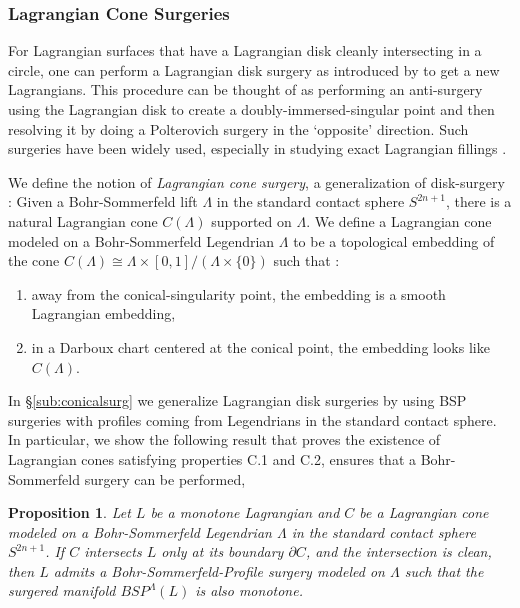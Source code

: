 \documentclass[11pt, oneside,dvipsnames]{amsart}
\newcommand{\<}{\langle}
\renewcommand{\>}{\rangle}
\newtheorem*{prop*}{Proposition}
\theoremstyle{definition}
\theoremstyle{definition}
\numberwithin{equation}{subsection}
\begin{document}
\subsubsection{Lagrangian Cone Surgeries}

For Lagrangian surfaces that have a Lagrangian disk cleanly intersecting in a circle, one can perform a Lagrangian disk surgery as introduced by \cite{yau17} to get a new Lagrangians. This procedure can be thought of as performing an anti-surgery using the Lagrangian disk to create a doubly-immersed-singular point and then resolving it by doing a Polterovich surgery in the `opposite' direction. Such surgeries have been widely used, especially in studying exact Lagrangian fillings \cite{stw1,stw2,cginfty,cwmicro}.

We define the notion of \textit{ Lagrangian cone surgery}, a generalization of disk-surgery : Given a Bohr-Sommerfeld lift $\Lambda$ in the standard contact sphere $S^{2n+1}$, there is a natural Lagrangian cone $C(\Lambda)$ supported on $\Lambda$. We define a Lagrangian cone modeled on a Bohr-Sommerfeld Legendrian $\Lambda$ to be a topological embedding of 
 the cone $C(\Lambda) \cong \Lambda \times [0,1] / ( \Lambda \times \{ 0\})$ such that :
 \begin{enumerate}[({C}.1)]
     \item  away from the conical-singularity point, the embedding is a smooth Lagrangian embedding,
     \item in a Darboux chart centered at the conical point, the embedding looks like $C(\Lambda)$.
\end{enumerate}
In \S \ref{sub:conicalsurg} we generalize Lagrangian disk surgeries by using BSP surgeries with profiles coming from Legendrians in the standard contact sphere. In particular, we show the following result that proves the existence of Lagrangian cones satisfying properties C.1 and C.2, ensures that a Bohr-Sommerfeld surgery can be performed,

\begin{prop*}
    Let $L$ be a monotone Lagrangian and $C$ be a Lagrangian cone modeled on a Bohr-Sommerfeld Legendrian $\Lambda$ in the standard contact sphere $S^{2n+1}$. If $C$ intersects $L$ only at its boundary $\partial C$, and the intersection is clean, then $L$ admits a Bohr-Sommerfeld-Profile surgery modeled on $\Lambda$ such that the surgered manifold $BSP^{\Lambda}(L)$ is also monotone. 
\end{prop*}
\end{document}
